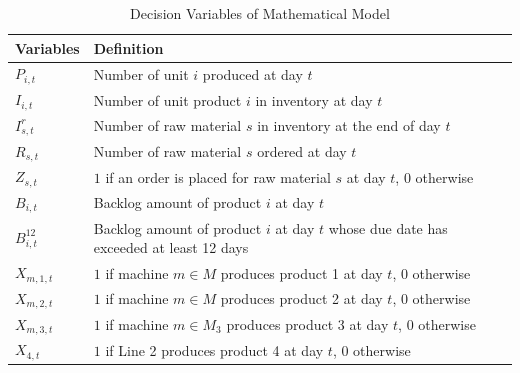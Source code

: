 \documentclass[11pt]{article}
\begin{document}
\begin{table}[h!]
\centering
\caption{Decision Variables of Mathematical Model}
\begin{tabular}{@{}lp{11cm}@{}}
\toprule
\textbf{Variables}& \textbf{Definition} \\
\midrule
$P_{i,t}$& Number of unit $i$ produced at day $t$\\
$I_{i,t}$& Number of unit product $i$ in inventory at day $t$\\
$I_{s,t}^r$& Number of raw material $s$ in inventory at the end of day $t$\\
$R_{s,t}$& Number of raw material $s$ ordered at day $t$\\
$Z_{s,t}$& $1$ if an order is placed for raw material $s$ at day $t$, $0$ otherwise\\
$B_{i,t}$& Backlog amount of product $i$ at day $t$\\
$B_{i,t}^{12}$& Backlog amount of product $i$ at day $t$ whose due date has exceeded at least 12 days\\
$X_{m,1,t}$& $1$ if machine $m\in M$ produces product 1 at day $t$, $0$ otherwise\\
$X_{m,2,t}$& $1$ if machine $m\in M$ produces product 2 at day $t$, $0$ otherwise\\
$X_{m,3,t}$& $1$ if machine $m\in M_3$ produces product 3 at day $t$, $0$ otherwise\\
$X_{4,t}$& $1$ if Line 2 produces product 4 at day $t$, $0$ otherwise\\
\bottomrule
\end{tabular}
\end{table}
\end{document}
